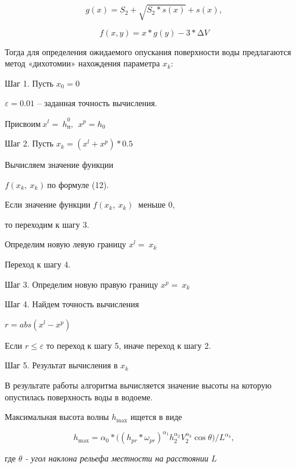 \begin{equation}
g(x) = S_{2} + \sqrt{S_{2}*s(x)} + s(x),
\end{equation}

\begin{equation}
f(x,y) = x*g(y) - 3*\mathrm{\Delta}V
\end{equation}

\begin{multicols}{2}
Тогда для определения ожидаемого опускания поверхности воды предлагаются
метод «дихотомии» нахождения параметра \(x_{k}:\)

Шаг 1. Пусть \(x_{0} = 0\)

\(\varepsilon = 0.01\) -- заданная точность вычисления.

Присвоим\(\ {x^{l} = \ h}_{п}^{0},\ {\ x}^{p} = h_{0}\)

Шаг 2. Пусть \(x_{k} = \left( x^{l} + x^{p} \right)*0.5\)

Вычисляем значение функции

\(f\left( x_{k},\ x_{k} \right)\ \)по формуле (12).

Если значение функции \(f\left( x_{k},\ x_{k} \right)\ \) меньше 0,

то переходим к шагу 3.

Определим новую левую границу \(x^{l} = \ x_{k}\)

Переход к шагу 4.

Шаг 3. Определим новую правую границу \(x^{p} = \ x_{k}\)

Шаг 4. Найдем точность вычисления

\(r = abs\left( x^{l} - x^{p} \right)\)

Если \(r \leq \varepsilon\) то переход к шагу 5, иначе переход к шагу 2.

Шаг 5. Результат вычисления в \(x_{k}\)

В результате работы алгоритма вычисляется значение высоты на которую
опустилась поверхность воды в водоеме.

Максимальная высота волны \(h_{\max}\) ищется в виде
\end{multicols}

\begin{equation}
h_{\max} = \alpha_{0}*(\left( h_{pr}*\omega_{pr} \right)^{\alpha_{1}}h_{2}^{\alpha_{2}}V_{2}^{\alpha_{3}}\cos{\theta)/L^{\alpha_{4}}},
\end{equation}

где $\theta$ \emph{- угол наклона рельефа местности на расстоянии} $L$

